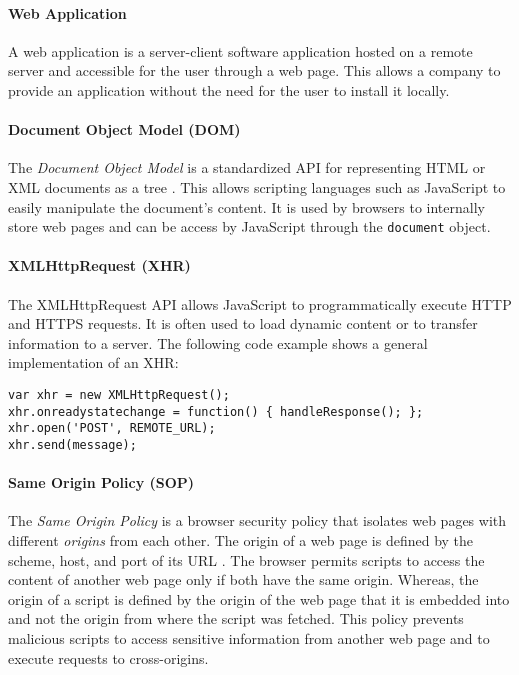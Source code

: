 \paragraph{Web Application}

	A web application is a server-client software application hosted on a remote server and accessible for the user through a web page. This allows a company to provide an application without the need for the user to install it locally.

\paragraph{Document Object Model (DOM)}

	The \textit{Document Object Model} is a standardized API for representing HTML or XML documents as a tree \cite{w3cDOMSpecification}. This allows scripting languages such as JavaScript to easily manipulate the document's content. It is used by browsers to internally store web pages and can be access by JavaScript through the \texttt{document} object. 

\paragraph{XMLHttpRequest (XHR)}

	The XMLHttpRequest API allows JavaScript to programmatically execute HTTP and HTTPS requests. It is often used to load dynamic content or to transfer information to a server. The following code example shows a general implementation of an XHR:
	
	\begin{lstlisting}
var xhr = new XMLHttpRequest();
xhr.onreadystatechange = function() { handleResponse(); };
xhr.open('POST', REMOTE_URL);
xhr.send(message);
\end{lstlisting}

\paragraph{Same Origin Policy (SOP)}
	
	The \textit{Same Origin Policy} is a browser security policy that isolates web pages with different \textit{origins} from each other. The origin of a web page is defined by the scheme, host, and port of its URL \cite{w3cOriginSpecification}. The browser permits scripts to access the content of another web page only if both have the same origin. Whereas, the origin of a script is defined by the origin of the web page that it is embedded into and not the origin from where the script was fetched. This policy prevents malicious scripts to access sensitive information from another web page and to execute requests to cross-origins. 
	

